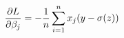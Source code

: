 \documentclass[preview]{standalone}
\begin{document}
\begin{align*}
\special{dvisvgm:raw <g id='unique000'>}\frac{\partial{L}}{\partial\beta_j}=-\frac{1}{n}\sum^n_{i=1}x_j(y-\sigma(z))\special{dvisvgm:raw </g>}
\end{align*}
\end{document}
